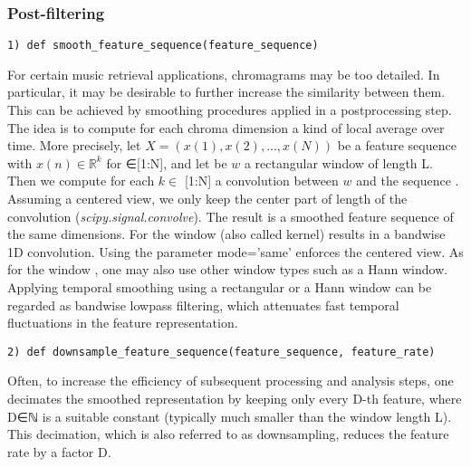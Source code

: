 \documentclass{article}
\begin{document}
\subsubsection{Post-filtering} 

\begin{lstlisting}
1) def smooth_feature_sequence(feature_sequence)
\end{lstlisting}
For certain music retrieval applications, chromagrams may be too detailed. In particular, it may be desirable to further increase the similarity between them. This can be achieved by smoothing procedures applied in a postprocessing step. The idea is to compute for each chroma dimension a kind of local average over time. 
More precisely, let \begin{math} X=(x(1),x(2),...,x(N)) \end{math} be a feature sequence with \begin{math}x(n)\in \mathbb{R}^k \end{math}  for ∈[1:N], and let be \begin{math} w \end{math} a rectangular window  of length L. Then we compute for each \begin{math}k \in \end{math}  [1:N] a convolution between \begin{math}w\end{math} and the sequence \begin{math}[x1(k),x2(k),...,xN(k)]\end{math}. Assuming a centered view, we only keep the center part of length of the convolution (\textit{scipy.signal.convolve}). The result is a smoothed feature sequence of the same dimensions.
For the window (also called kernel) results in a bandwise 1D convolution. Using the parameter mode='same' enforces the centered view. As for the window , one may also use other window types such as a Hann window. 
Applying temporal smoothing using a rectangular or a Hann window can be regarded as bandwise lowpass filtering, which attenuates fast temporal fluctuations in the feature representation. 

\begin{lstlisting}
2) def downsample_feature_sequence(feature_sequence, feature_rate)
\end{lstlisting}

Often, to increase the efficiency of subsequent processing and analysis steps, one decimates the smoothed representation by keeping only every D-th feature, where D∈ℕ is a suitable constant (typically much smaller than the window length L). This decimation, which is also referred to as downsampling, reduces the feature rate by a factor D.
\end{document}
